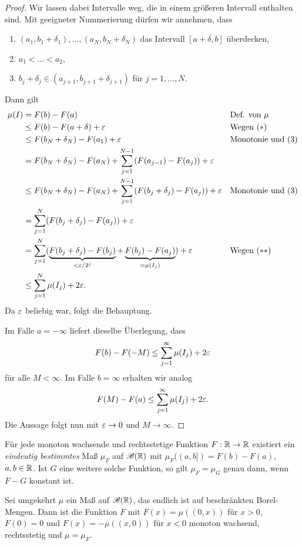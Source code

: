 \begin{proof}
 Wir lassen dabei Intervalle weg, die in einem größeren Intervall enthalten
 sind. Mit geeigneter Nummerierung dürfen wir annehmen, dass
 \begin{enumerate}[(1)]
  \item $(a_1, b_1 + \delta_1), \ldots, (a_N, b_N + \delta_N)$ das Intervall $[a+\delta,b]$ überdecken,
  \item $a_1 < \ldots < a_2$,
  \item $b_j + \delta_j \in (a_{j+1}, b_{j+1} + \delta_{j+1})$ für $j= 1, \ldots, N$.
 \end{enumerate}
 Dann gilt
 \begin{align*}
  \mu(I) &= F(b) - F(a) & &\text{Def. von $\mu$} \\
         &\le F(b) - F(a+\delta) + \varepsilon & &\text{Wegen } (*) \\
         &\le F(b_N + \delta_N) - F( a_1 ) + \varepsilon & &\text{Monotonie und (3)} \\
         &= F(b_N + \delta_N) - F( a_N ) + \sum_{j=1}^{N-1} (F(a_{j-1}) - F(a_j)) + \varepsilon \\
         &\le F(b_N + \delta_N) - F( a_N ) + \sum_{j=1}^{N-1} (F(b_j + \delta_j) - F(a_j)) + \varepsilon & &\text{Monotonie und (3)} \\
         &=\sum_{j=1}^N (F(b_j + \delta_j) - F(a_j)) + \varepsilon \\
         &=\sum_{j=1}^N (\underbrace{F(b_j + \delta_j) - F(b_j)}_{< \varepsilon/2^j} + \underbrace{F(b_j) - F(a_j)}_{=\mu(I_j)}) + \varepsilon & &\text{Wegen } (**)\\
         &\le \sum_{j=1}^N \mu(I_j) + 2\varepsilon.
 \end{align*}
 Da $\varepsilon$ beliebig war, folgt die Behauptung.

 Im Falle $a= -\infty$ liefert dieselbe Überlegung, dass 
 \[ F(b) - F(-M) \le \sum_{j=1}^\infty \mu(I_j) + 2 \varepsilon \]
 für alle $M < \infty$. Im Falle $b = \infty$ erhalten wir analog
 \[ F(M) - F(a) \le \sum_{j=1}^\infty \mu(I_j) + 2 \varepsilon. \]
 Die Aussage folgt nun mit $\varepsilon \to 0$ und $M \to \infty$.
\end{proof}

\begin{thm}
 Für jede monoton wachsende und rechtsstetige Funktion $F: \mathbb{R} \to \mathbb{R}$
 existiert ein \emph{eindeutig bestimmtes} Maß $\mu_F$ auf $\mathscr{B}(\mathbb{R})$ mit
 $\mu_F( (a,b] ) = F(b) - F(a)$, $a,b \in \mathbb{R}$. Ist $G$ eine weitere solche
 Funktion, so gilt $\mu_F = \mu_G$ genau dann, wenn $F-G$ konstant ist.
 
 Sei umgekehrt $\mu$ ein Maß auf $\mathscr{B}(\mathbb{R})$, das endlich ist auf
 beschränkten Borel-Mengen. Dann ist die Funktion $F$ mit $F(x) = \mu((0,x))$
 für $x>0$, $F(0) = 0$ und $F(x) = - \mu((x,0))$ für $x<0$ monoton wachsend,
 rechtsstetig und $\mu = \mu_F$.
\end{thm}

